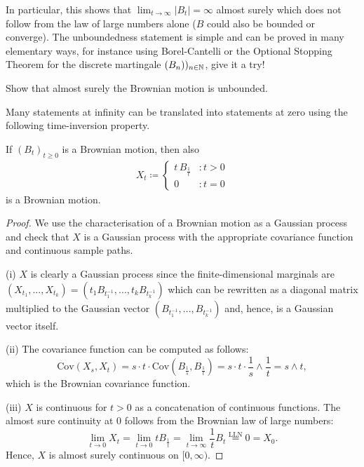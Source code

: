  In particular, this shows that $\lim_{t\to\infty}|B_t|=\infty$ almost surely which does not follow from the law of large numbers alone ($B$ could also be bounded or converge). The unboundedness statement is simple and can be proved in many elementary ways, for instance using Borel-Cantelli or the Optional Stopping Theorem for the discrete martingale $(B_n))_{n\in\mathbb{N}}$, give it a try!
\begin{luebung}
	 Show that almost surely the Brownian motion is unbounded.
 \end{luebung}
Many statements at infinity can be translated into statements at zero using the following time-inversion property.
\begin{laussagewerkzeug}
\begin{prop}
	If $(B_t)_{t\geq 0}$ is a Brownian motion, then also 
	\begin{align*}
		X_t\coloneqq \begin{cases}
					t\, B_{\frac{1}{t}} &: t> 0 \\
					0 &: t=0
					\end{cases}
	\end{align*}
	is a Brownian motion.
\end{prop}
\end{laussagewerkzeug}
\begin{proof}[Proof] 
	We use the characterisation of a Brownian motion as a Gaussian process and check that $X$ is a Gaussian process with the appropriate covariance function and continuous sample paths.\smallskip

	(i) $X$ is clearly a Gaussian process since the finite-dimensional marginals are $(X_{t_1},...,X_{t_k})=(t_1 B_{t_1^{-1}},...,t_k B_{t_k^{-1}})$ which can be rewritten as a diagonal matrix multiplied to the Gaussian vector $(B_{t_1^{-1}},...,B_{t_k^{-1}})$ and, hence, is a Gaussian vector itself.\smallskip

	(ii) The covariance function can be computed as follows:
	$$\text{Cov}(X_s,X_t) = s\cdot t \cdot \text{Cov}(B_{\frac{1}{s}},B_{\frac{1}{t}}) = s\cdot t \cdot \frac{1}{s}\wedge \frac{1}{t}=s\wedge t,$$ which is the Brownian covariance function.\smallskip

	(iii) $X$ is continuous for $t>0$ as a concatenation of continuous functions. The almost sure continuity at $0$ follows from the Brownian law of large numbers: $$\lim_{t\to 0} X_t = \lim_{t\to 0} t B_{\frac{1}{t}} = \lim_{t\to\infty} \frac{1}{t} B_t \overset{\text{LLN}}{=} 0 = X_0.$$ Hence, $X$ is almost surely continuous on $[0,\infty)$.
	\end{proof}
